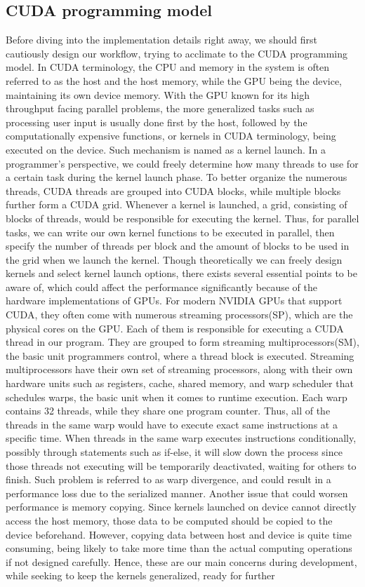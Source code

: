 \documentclass{PHlab-thesis}
\begin{document}
\subsection{CUDA programming model}
Before diving into the implementation details right away, we should first cautiously design our workflow, trying to acclimate to the CUDA programming model. In CUDA terminology, the CPU and memory in the system is often referred to as the host and the host memory, while the GPU being the device, maintaining its own device memory. With the GPU known for its high throughput facing parallel problems, the more generalized tasks such as processing user input is usually done first by the host, followed by the computationally expensive functions, or kernels in CUDA terminology, being executed on the device. Such mechanism is named as a kernel launch. In a programmer's perspective, we could freely determine how many threads to use for a certain task during the kernel launch phase. To better organize the numerous threads, CUDA threads are grouped into CUDA blocks, while multiple blocks further form a CUDA grid. Whenever a kernel is launched, a grid, consisting of blocks of threads, would be responsible for executing the kernel. Thus, for parallel tasks, we can write our own kernel functions to be executed in parallel, then specify the number of threads per block and the amount of blocks to be used in the grid when we launch the kernel. Though theoretically we can freely design kernels and select kernel launch options, there exists several essential points to be aware of, which could affect the performance significantly because of the hardware implementations of GPUs. For modern NVIDIA GPUs that support CUDA, they often come with numerous streaming processors(SP), which are the physical cores on the GPU. Each of them is responsible for executing a CUDA thread in our program. They are grouped to form streaming multiprocessors(SM), the basic unit programmers control, where a thread block is executed. Streaming multiprocessors have their own set of streaming processors, along with their own hardware units such as registers, cache, shared memory, and warp scheduler that schedules warps, the basic unit when it comes to runtime execution. Each warp contains 32 threads, while they share one program counter. Thus, all of the threads in the same warp would have to execute exact same instructions at a specific time. When threads in the same warp executes instructions conditionally, possibly through statements such as if-else, it will slow down the process since those threads not executing will be temporarily deactivated, waiting for others to finish. Such problem is referred to as warp divergence, and could result in a performance loss due to the serialized manner. Another issue that could worsen performance is memory copying. Since kernels launched on device cannot directly access the host memory, those data to be computed should be copied to the device beforehand. However, copying data between host and device is quite time consuming, being likely to take more time than the actual computing operations if not designed carefully. Hence, these are our main concerns during development, while seeking to keep the kernels generalized, ready for further 
\end{document}
